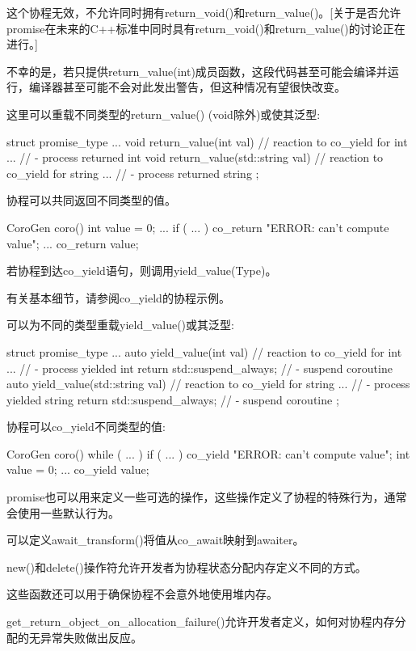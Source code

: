这个协程无效，不允许同时拥有return\_void()和return\_value()。[关于是否允许promise在未来的C++标准中同时具有return\_void()和return\_value()的讨论正在进行。]

不幸的是，若只提供return\_value(int)成员函数，这段代码甚至可能会编译并运行，编译器甚至可能不会对此发出警告，但这种情况有望很快改变。

这里可以重载不同类型的return\_value() (void除外)或使其泛型:

\begin{cpp}
struct promise_type {
	...
	void return_value(int val) { // reaction to co_yield for int
		... // - process returned int
	}
	void return_value(std::string val) { // reaction to co_yield for string
		... // - process returned string
	}
};
\end{cpp}

协程可以共同返回不同类型的值。

\begin{cpp}
CoroGen coro()
{
	int value = 0;
	...
	if ( ... ) {
		co_return "ERROR: can't compute value";
	}
	...
	co_return value;
}
\end{cpp}


若协程到达co\_yield语句，则调用yield\_value(Type)。

有关基本细节，请参阅co\_yield的协程示例。

可以为不同的类型重载yield\_value()或其泛型:

\begin{cpp}
struct promise_type {
	...
	auto yield_value(int val) { // reaction to co_yield for int
		... // - process yielded int
		return std::suspend_always{}; // - suspend coroutine
	}
	auto yield_value(std::string val) { // reaction to co_yield for string
		... // - process yielded string
		return std::suspend_always{}; // - suspend coroutine
	}
};
\end{cpp}

协程可以co\_yield不同类型的值:

\begin{cpp}
CoroGen coro()
{
	while ( ... ) {
		if ( ... ) {
			co_yield "ERROR: can't compute value";
		}
		int value = 0;
		...
		co_yield value;
	}
}
\end{cpp}


promise也可以用来定义一些可选的操作，这些操作定义了协程的特殊行为，通常会使用一些默认行为。


可以定义await\_transform()将值从co\_await映射到awaiter。


new()和delete()操作符允许开发者为协程状态分配内存定义不同的方式。

这些函数还可以用于确保协程不会意外地使用堆内存。


get\_return\_object\_on\_allocation\_failure()允许开发者定义，如何对协程内存分配的无异常失败做出反应。








